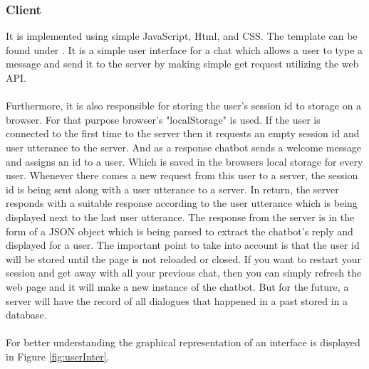 \subsubsection*{Client}
It is implemented using simple JavaScript, Html, and CSS. The template can be found under \cite{userinterface}. It is a simple user interface for a chat which allows a user to type a message and send it to the server by making simple get request utilizing the web API. 
\\~\\
Furthermore, it is also responsible for storing the user's session id to storage on a browser. For that purpose browser's "localStorage" \cite{localstorage} is used. If the user is connected to the first time to the server then it requests an empty session id and user utterance to the server. And as a response chatbot sends a welcome message and assigns an id to a user. Which is saved in the browsers local storage for every user. Whenever there comes a new request from this user to a server, the session id is being sent along with a user utterance to a server. In return, the server responds with a suitable response according to the user utterance which is being displayed next to the last user utterance. The response from the server is in the form of a JSON object which is being parsed to extract the chatbot's reply and displayed for a user. The important point to take into account is that the user id will be stored until the page is not reloaded or closed. If you want to restart your session and get away with all your previous chat, then you can simply refresh the web page and it will make a new instance of the chatbot. But for the future, a server will have the record of all dialogues that happened in a past stored in a database. 
\\~\\
For better understanding the graphical representation of an interface is displayed in Figure \ref{fig:userInter}.

